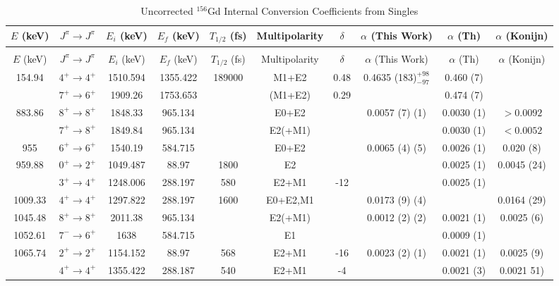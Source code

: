 \begin{landscape}
    \begin{longtable}{c|c|c|c|c|c|c|c|c|c}
    \caption{Uncorrected $^{156}$Gd Internal Conversion Coefficients from Singles}
        \label{tab:156Gd_Single_ICC_Uncorr}\\
    \toprule
$E$ (keV)	&	$J^{\pi}	\rightarrow	J^{\pi}$	&	$E_i$ (keV)	&	$E_f$ (keV)	&	$T_{1/2}$ (fs)	&	Multipolarity	&	$\delta$	&	$\alpha$ (This Work)	&	$\alpha$  (Th)	&	$\alpha$ (Konijn)	\\
\hline		
\endfirsthead
    \caption[]{Uncorrected $^{156}$Gd Internal Conversion Coefficients from Singles}\\
    \toprule
$E$ (keV)	&	$J^{\pi}	\rightarrow	J^{\pi}$	&	$E_i$ (keV)	&	$E_f$ (keV)	&	$T_{1/2}$ (fs)	&	Multipolarity	&	$\delta$	&	$\alpha$ (This Work)	&	$\alpha$  (Th)	&	$\alpha$ (Konijn)	\\
\hline		
\endhead
154.94	&	$4^+	\rightarrow	4^+$	&	1510.594	&	1355.422	&	189000	&	M1+E2	&	0.48	&	0.4635 (183)$^{+98}_{-97}$	&	0.460 (7)	& \\
	&	$7^+	\rightarrow	6^+$	&	1909.26	&	1753.653	&		&	(M1+E2)	&	0.29	&		&	0.474 (7)	&		\\ \hline
883.86	&	$8^+	\rightarrow	8^+$	&	1848.33	&	965.134	&		&	E0+E2	&		&	0.0057 (7) (1)	&	0.0030 (1)	& $>0.0092$		\\
	&	$7^+	\rightarrow	8^+$	&	1849.84	&	965.134	&		&	E2(+M1)	&		&		&	0.0030 (1)	&	$<0.0052$	\\ \hline
955	&	$6^+	\rightarrow	6^+$	&	1540.19	&	584.715	&		&	E0+E2	&		&	0.0065 (4) (5)	&	0.0026 (1)	&	0.020 (8)	\\ 
959.88	&	$0^+	\rightarrow	2^+$	&	1049.487	&	88.97	&	1800	&	E2	&		&	&	0.0025 (1)	&	0.0045 (24)	\\
	&	$3^+	\rightarrow	4^+$	&	1248.006	&	288.197	&	580	&	E2+M1	&	-12	&		&	0.0025 (1)	&		\\ \hline
1009.33	&	$4^+	\rightarrow	4^+$	&	1297.822	&	288.197	&	1600	&	E0+E2,M1	&		&	0.0173 (9) (4)	&		&	0.0164 (29)	\\ \hline
1045.48	&	$8^+	\rightarrow	8^+$	&	2011.38	&	965.134	&		&	E2(+M1)	&		&	0.0012 (2) (2)	&	0.0021 (1)	&	0.0025 (6)	\\ 
1052.61	&	$7^-	\rightarrow	6^+$	&	1638	&	584.715	&		&	E1	&		&		&	0.0009 (1)	&		\\ \hline
1065.74	&	$2^+	\rightarrow	2^+$	&	1154.152	&	88.97	&	568	&	E2+M1	&	-16	&	0.0023 (2) (1)	&	0.0021 (1)	&	0.0025 (9)	\\
	&	$4^+	\rightarrow	4^+$	&	1355.422	&	288.187	&	540	&	E2+M1	&	-4	&		&	0.0021 (3)	&	0.0021 51)	\\ \hline

\end{longtable}
\end{landscape}
